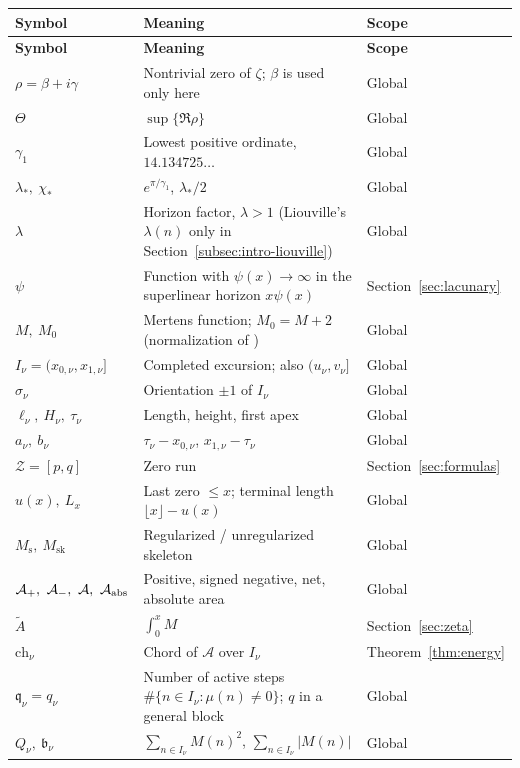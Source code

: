 \documentclass[11pt,reqno]{amsart}
\numberwithin{equation}{section}
\theoremstyle{plain}
\theoremstyle{definition}
\theoremstyle{remark}
\newcommand{\Ms}{M_{\mathrm{s}}}
\newcommand{\Msk}{M_{\mathrm{sk}}}
\newcommand{\Ap}{\mathcal{A}_{+}}
\newcommand{\Am}{\mathcal{A}_{-}}
\newcommand{\Anet}{\mathcal{A}}
\begin{document}
\small
\setlength{\LTpre}{4pt}
\setlength{\LTpost}{8pt}
\begin{longtable}{@{}p{}p{}p{}@{}}
\toprule
\textbf{Symbol} & \textbf{Meaning} & \textbf{Scope}\\
\midrule
\endfirsthead
\toprule
\textbf{Symbol} & \textbf{Meaning} & \textbf{Scope}\\
\midrule
\endhead
$\rho=\beta+i\gamma$ & Nontrivial zero of $\zeta$; $\beta$ is used only here & Global\\
$\Theta$ & $\sup\{\Re\rho\}$ & Global\\
$\gamma_1$ & Lowest positive ordinate, $14.134725\ldots$ & Global\\
$\lambda_*,\ \chi_*$ & $e^{\pi/\gamma_1}$, $\lambda_*/2$ & Global\\
$\lambda$ & Horizon factor, $\lambda>1$ (Liouville's $\lambda(n)$ only in Section~\ref{subsec:intro-liouville}) & Global\\
$\psi$ & Function with $\psi(x)\to\infty$ in the superlinear horizon $x\psi(x)$ & Section~\ref{sec:lacunary}\\
$M,\ M_0$ & Mertens function; $M_0=M+2$ (normalization of \cite{KP86}) & Global\\
$I_\nu=(x_{0,\nu},x_{1,\nu}]$ & Completed excursion; also $(u_\nu,v_\nu]$ & Global\\
$\sigma_\nu$ & Orientation $\pm1$ of $I_\nu$ & Global\\
$\ell_\nu,\ H_\nu,\ \tau_\nu$ & Length, height, first apex & Global\\
$a_\nu,\ b_\nu$ & $\tau_\nu-x_{0,\nu}$, $x_{1,\nu}-\tau_\nu$ & Global\\
$\mathcal Z=[p,q]$ & Zero run & Section~\ref{sec:formulas}\\
$u(x),\ L_x$ & Last zero $\le x$; terminal length $\lfloor x\rfloor-u(x)$ & Global\\
$\Ms,\ \Msk$ & Regularized / unregularized skeleton & Global\\
$\Ap,\ \Am,\ \Anet,\ \mathcal A_{\rm abs}$ & Positive, signed negative, net, absolute area & Global\\
$\widetilde A$ & $\int_0^xM$ & Section~\ref{sec:zeta}\\
$\mathrm{ch}_\nu$ & Chord of $\Anet$ over $I_\nu$ & Theorem~\ref{thm:energy}\\
$\mathfrak q_\nu=q_\nu$ & Number of active steps $\#\{n\in I_\nu:\mu(n)\ne0\}$; $q$ in a general block & Global\\
$Q_\nu,\ \mathfrak b_\nu$ & $\sum_{n\in I_\nu}M(n)^2$, $\sum_{n\in I_\nu}|M(n)|$ & Global\\

\end{longtable}
\end{document}

